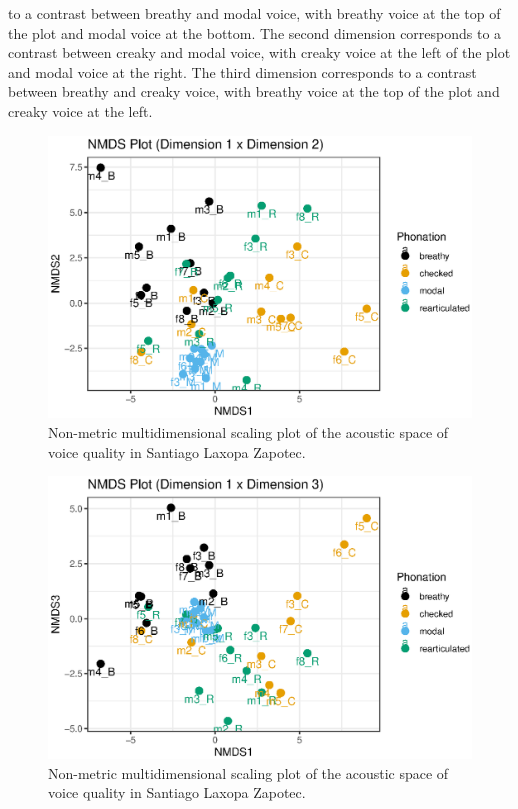 to a contrast between breathy and modal voice, with breathy voice at the top of the plot and modal voice at the bottom. The second dimension corresponds to a contrast between creaky and modal voice, with creaky voice at the left of the plot and modal voice at the right. The third dimension corresponds to a contrast between breathy and creaky voice, with breathy voice at the top of the plot and creaky voice at the left.
\begin{figure}
    \centering
    \includegraphics{images/nmds12.eps}
    \caption{Non-metric multidimensional scaling plot of the acoustic space of voice quality in Santiago Laxopa Zapotec.}
    \label{fig:nmds12}
    \end{figure}
    
    \begin{figure}
        \centering
        \includegraphics{images/nmds13.eps}
        \caption{Non-metric multidimensional scaling plot of the acoustic space of voice quality in Santiago Laxopa Zapotec.}
        \label{fig:nmds13}
    \end{figure}
    
